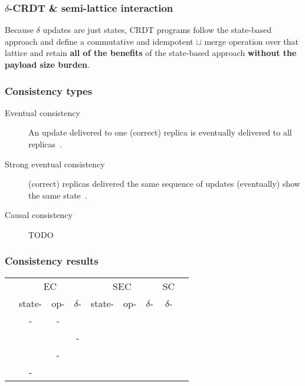 \documentclass[aspectratio=169,compress]{beamer}
\newcommand{\cmark}{\ding{51}}
\begin{document}
  \begin{frame}
    \frametitle{$\delta$-CRDT \& semi-lattice interaction}

    Because $\delta$ updates are just states, CRDT programs follow the
    state-based approach and define a commutative and idempotent $\sqcup$ merge
    operation over that lattice and retain \textbf{all of the benefits} of
    the state-based approach \textbf{without the payload size burden}.
  \end{frame}

  \begin{frame}
    \frametitle{Consistency types}

    \begin{description}
      \item[Eventual consistency] An update delivered to one (correct) replica
        is eventually delivered to all replicas~\citep{shapiro11}.
      \item[Strong eventual consistency] (correct) replicas delivered the same
        sequence of updates (eventually) show the same state~\citep{shapiro11}.
      \item[Causal consistency] TODO
    \end{description}
  \end{frame}

  \begin{frame}
    \frametitle{Consistency results}

    \begin{table}
      \begin{tabular}{rcccccccc}
        & \multicolumn{3}{c}{EC}
        & \multicolumn{3}{c}{SEC}
        & \multicolumn{1}{c}{SC} \\
        \cmidrule(lr){2-4} \cmidrule(lr){5-7} \cmidrule(lr){8-8}
          & state- & op- & $\delta$-
          & state- & op- & $\delta$-
          & $\delta$- \\
        \midrule
          \cite{shapiro11} & - & - & & \cmark & \cmark & & \\
          \cite{almeida16} & & & - & & & \cmark & \cmark   \\
          \cite{gomes17} & & - & & & \cmark\footnotemark[1] & & \\
          \cite{zeller14} & - & & & \cmark\footnotemark[2] & & & \\
      \end{tabular}
    \end{table}
  \end{frame}
\end{document}
